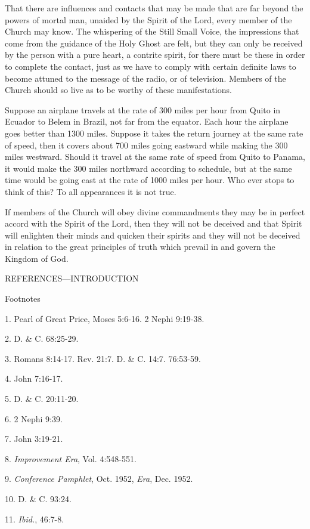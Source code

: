 That there are influences and contacts that may be made that are far beyond the powers of
mortal man, unaided by the Spirit of the Lord, every member of the Church may know. The
whispering of the Still Small Voice, the impressions that come from the guidance of the Holy
Ghost are felt, but they can only be received by the person with a pure heart, a contrite spirit,
for there must be these in order to complete the contact, just as we have to comply with
certain definite laws to become attuned to the message of the radio, or of television.
Members of the Church should so live as to be worthy of these manifestations.

Suppose an airplane travels at the rate of 300 miles per hour from Quito in Ecuador to Belem
in Brazil, not far from the equator. Each hour the airplane goes better than 1300 miles.
Suppose it takes the return journey at the same rate of speed, then it covers about 700 miles
going eastward while making the 300 miles westward. Should it travel at the same rate of
speed from Quito to Panama, it would make the 300 miles northward according to schedule,
but at the same time would be going east at the rate of 1000 miles per hour. Who ever stops
to think of this? To all appearances it is not true.

If members of the Church will obey divine commandments they may be in perfect accord
with the Spirit of the Lord, then they will not be deceived and that Spirit will enlighten their
minds and quicken their spirits and they will not be deceived in relation to the great
principles of truth which prevail in and govern the Kingdom of God.

\newpage
REFERENCES—INTRODUCTION

Footnotes

1. Pearl of Great Price, Moses 5:6-16. 2 Nephi 9:19-38.

2. D. \& C. 68:25-29.

3. Romans 8:14-17. Rev. 21:7. D. \& C. 14:7. 76:53-59.

4. John 7:16-17.

5. D. \& C. 20:11-20.

6. 2 Nephi 9:39.

7. John 3:19-21.

8. \textit{Improvement Era}, Vol. 4:548-551.

9. \textit{Conference Pamphlet}, Oct. 1952, \textit{Era}, Dec. 1952.

10. D. \& C. 93:24.

11. \textit{Ibid.}, 46:7-8.

